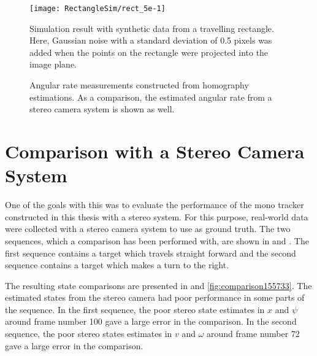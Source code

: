 \begin{figure}[!ht]
	\centering
	\texttt{[image: RectangleSim/rect\_5e-1]}
	\caption{\label{fig:rectsim5e-1} Simulation result with synthetic data from a travelling rectangle. Here, Gaussian noise with a standard deviation of 0.5 pixels was added when the points on the rectangle were projected into the image plane.}
\end{figure}

\begin{figure}[!ht]
	\centering

	\caption{\label{fig:angvelmeas} Angular rate measurements constructed from homography estimations. As a comparison, the estimated angular rate from a stereo camera system is shown as well.}
\end{figure}

\clearpage

\section{Comparison with a Stereo Camera System}
One of the goals with this \ms was to evaluate the performance of the mono tracker constructed in this thesis with a stereo system.
For this purpose, real-world data were collected with a stereo camera system to use as ground truth.
The two sequences, which a comparison has been performed with, are shown in  and .
The first sequence contains a target which travels straight forward and the second sequence contains a target which makes a turn to the right.

The resulting state comparisons are presented in  and \ref{fig:comparison155733}.
The estimated states from the stereo camera had poor performance in some parts of the sequence.
In the first sequence, the poor stereo state estimates in $x$ and $\psi$ around frame number 100 gave a large error in the comparison.
In the second sequence, the poor stereo states estimates in $v$ and $\omega$ around frame number 72 gave a large error in the comparison.

